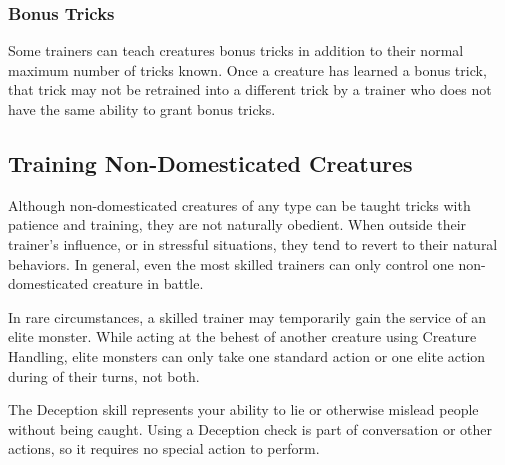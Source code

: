     \subsubsection{Bonus Tricks}\label{Bonus Tricks}
      Some trainers can teach creatures bonus tricks in addition to their normal maximum number of tricks known.
      Once a creature has learned a bonus trick, that trick may not be retrained into a different trick by a trainer who does not have the same ability to grant bonus tricks.

  \subsection{Training Non-Domesticated Creatures}
    Although non-domesticated creatures of any type can be taught tricks with patience and training, they are not naturally obedient.
    When outside their trainer's influence, or in stressful situations, they tend to revert to their natural behaviors.
    In general, even the most skilled trainers can only control one non-domesticated creature in battle.

    In rare circumstances, a skilled trainer may temporarily gain the service of an elite monster.
    While acting at the behest of another creature using Creature Handling, elite monsters can only take one standard action or one elite action during of their turns, not both.

\newpage
{}
  The Deception skill represents your ability to lie or otherwise mislead people without being caught.
  Using a Deception check is part of conversation or other actions, so it requires no special action to perform.

